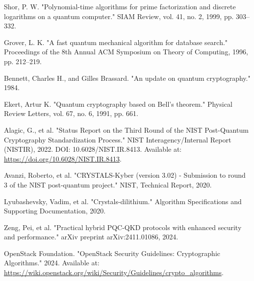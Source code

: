 \documentclass[conference]{IEEEtran}
\begin{document}
\begin{comment}
Finally, the use cases presented confirm the relevance of the proposed protocol in critical sectors, such as military, financial and healthcare, where information security is paramount. As quantum computing advances, hybrid solutions such as the one presented in the article will be fundamental for the transition to a new era of quantum computing.
\end{comment}

% 
% 

\begin{thebibliography}{00}

 Shor, P. W. "Polynomial-time algorithms for prime factorization and discrete logarithms on a quantum computer." SIAM Review, vol. 41, no. 2, 1999, pp. 303–332.

 Grover, L. K. "A fast quantum mechanical algorithm for database search." Proceedings of the 8th Annual ACM Symposium on Theory of Computing, 1996, pp. 212–219.

 Bennett, Charles H., and Gilles Brassard. "An update on quantum cryptography." 1984.

 Ekert, Artur K. "Quantum cryptography based on Bell’s theorem." Physical Review Letters, vol. 67, no. 6, 1991, pp. 661.

 Alagic, G., et al. "Status Report on the Third Round of the NIST Post-Quantum Cryptography Standardization Process." NIST Interagency/Internal Report (NISTIR), 2022. DOI: 10.6028/NIST.IR.8413. Available at: \url{https://doi.org/10.6028/NIST.IR.8413}.

 Avanzi, Roberto, et al. "CRYSTALS-Kyber (version 3.02) - Submission to round 3 of the NIST post-quantum project." NIST, Technical Report, 2020.

 Lyubashevsky, Vadim, et al. "Crystals-dilithium." Algorithm Specifications and Supporting Documentation, 2020.

 Zeng, Pei, et al. "Practical hybrid PQC-QKD protocols with enhanced security and performance." arXiv preprint arXiv:2411.01086, 2024.

 OpenStack Foundation. "OpenStack Security Guidelines: Cryptographic Algorithms." 2024. Available at: \url{https://wiki.openstack.org/wiki/Security/Guidelines/crypto_algorithms}.


\end{thebibliography}
\end{document}
